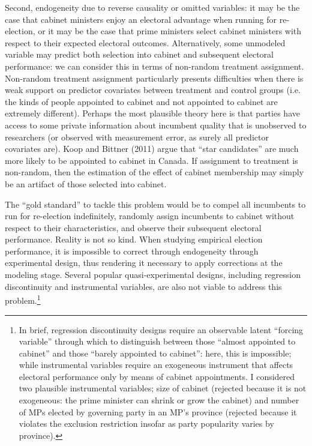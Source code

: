 \documentclass[letter,12pt]{article}
\begin{document}
Second, endogeneity due to reverse causality or omitted variables: it may be the case that cabinet ministers enjoy an electoral advantage when running for re-election, or it may be the case that prime ministers select cabinet ministers with respect to their expected electoral outcomes. Alternatively, some unmodeled variable may predict both selection into cabinet and subsequent electoral performance: we can consider this in terms of non-random treatment assignment. Non-random treatment assignment particularly presents difficulties when there is weak support on predictor covariates between treatment and control groups (i.e. the kinds of people appointed to cabinet and not appointed to cabinet are extremely different). Perhaps the most plausible theory here is that parties have access to some private information about incumbent quality that is unobserved to researchers (or observed with measurement error, as surely all predictor covariates are). Koop and Bittner (2011) argue that ``star candidates'' are much more likely to be appointed to cabinet in Canada. If assignment to treatment is non-random, then the estimation of the effect of cabinet membership may simply be an artifact of those selected into cabinet.

The ``gold standard'' to tackle this problem would be to compel all incumbents to run for re-election indefinitely, randomly assign incumbents to cabinet without respect to their characteristics, and observe their subsequent electoral performance. Reality is not so kind. When studying empirical election performance, it is impossible to correct through endogeneity through experimental design, thus rendering it necessary to apply corrections at the modeling stage. Several popular quasi-experimental designs, including regression discontinuity and instrumental variables, are also not viable to address this problem.\footnote{In brief, regression discontinuity designs require an observable latent ``forcing variable'' through which to distinguish between those ``almost appointed to cabinet'' and those ``barely appointed to cabinet'': here, this is impossible; while instrumental variables require an exogeneous instrument that affects electoral performance only by means of cabinet appointments. I considered two plausible instrumental variables; size of cabinet (rejected because it is not exogeneous: the prime minister can shrink or grow the cabinet) and number of MPs elected by governing party in an MP's province (rejected because it violates the exclusion restriction insofar as party popularity varies by province).}
\end{document}
